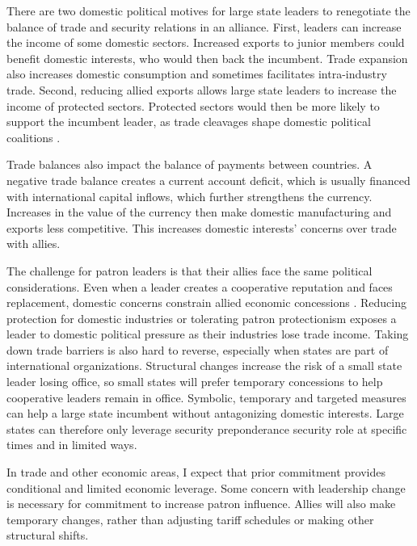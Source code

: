\documentclass[12pt]{article}
\begin{document}
There are two domestic political motives for large state leaders to renegotiate the balance of trade and security relations in an alliance. 
First, leaders can increase the income of some domestic sectors.
Increased exports to junior members could benefit domestic interests, who would then back the incumbent. 
Trade expansion also increases domestic consumption and sometimes facilitates intra-industry trade.
Second, reducing allied exports allows large state leaders to increase the income of protected sectors.
Protected sectors would then be more likely to support the incumbent leader, as trade cleavages shape domestic political coalitions \citep{Rogowski1987, Hiscox2001}. 
 

Trade balances also impact the balance of payments between countries.
A negative trade balance creates a current account deficit, which is usually financed with international capital inflows, which further strengthens the currency. 
Increases in the value of the currency then make domestic manufacturing and exports less competitive. 
This increases domestic interests' concerns over trade with allies. 


The challenge for patron leaders is that their allies face the same political considerations. 
Even when a leader creates a cooperative reputation and faces replacement, domestic concerns constrain allied economic concessions \citep{Davis2008}. 
Reducing protection for domestic industries or tolerating patron protectionism exposes a leader to domestic political pressure as their industries lose trade income.
Taking down trade barriers is also hard to reverse, especially when states are part of international organizations.
Structural changes increase the risk of a small state leader losing office, so small states will prefer temporary concessions to help cooperative leaders remain in office.
Symbolic, temporary and targeted measures can help a large state incumbent without antagonizing domestic interests. 
Large states can therefore only leverage security preponderance security role at specific times and in limited ways.


In trade and other economic areas, I expect that prior commitment provides conditional and limited economic leverage. 
Some concern with leadership change is necessary for commitment to increase patron influence. 
Allies will also make temporary changes, rather than adjusting tariff schedules or making other structural shifts. 
\end{document}
